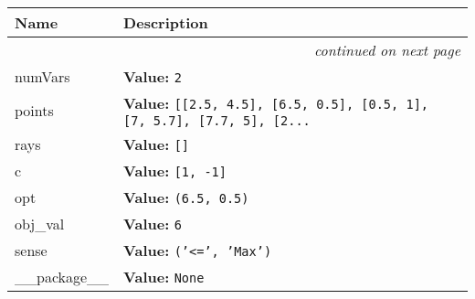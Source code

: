     \vspace{-1cm}
\hspace{\varindent}\begin{longtable}{|p{\varnamewidth}|p{\vardescrwidth}|l}
\cline{1-2}
\cline{1-2} \centering \textbf{Name} & \centering \textbf{Description}& \\
\cline{1-2}
\endhead\cline{1-2}\multicolumn{3}{r}{\small\textit{continued on next page}}\\\endfoot\cline{1-2}
\endlastfoot\raggedright n\-u\-m\-V\-a\-r\-s\- & \raggedright \textbf{Value:} 
{\tt 2}&\\
\cline{1-2}
\raggedright p\-o\-i\-n\-t\-s\- & \raggedright \textbf{Value:} 
{\tt \texttt{[}\texttt{[}2.5\texttt{, }4.5\texttt{]}\texttt{, }\texttt{[}6.5\texttt{, }0.5\texttt{]}\texttt{, }\texttt{[}0.5\texttt{, }1\texttt{]}\texttt{, }\texttt{[}7\texttt{, }5.7\texttt{]}\texttt{, }\texttt{[}7.7\texttt{, }5\texttt{]}\texttt{, }\texttt{[}2\texttt{...}}&\\
\cline{1-2}
\raggedright r\-a\-y\-s\- & \raggedright \textbf{Value:} 
{\tt \texttt{[}\texttt{]}}&\\
\cline{1-2}
\raggedright c\- & \raggedright \textbf{Value:} 
{\tt \texttt{[}1\texttt{, }-1\texttt{]}}&\\
\cline{1-2}
\raggedright o\-p\-t\- & \raggedright \textbf{Value:} 
{\tt \texttt{(}6.5\texttt{, }0.5\texttt{)}}&\\
\cline{1-2}
\raggedright o\-b\-j\-\_\-v\-a\-l\- & \raggedright \textbf{Value:} 
{\tt 6}&\\
\cline{1-2}
\raggedright s\-e\-n\-s\-e\- & \raggedright \textbf{Value:} 
{\tt \texttt{(}\texttt{'}\texttt{{\textless}=}\texttt{'}\texttt{, }\texttt{'}\texttt{Max}\texttt{'}\texttt{)}}&\\
\cline{1-2}
\raggedright \_\-\_\-p\-a\-c\-k\-a\-g\-e\-\_\-\_\- & \raggedright \textbf{Value:} 
{\tt None}&\\
\cline{1-2}
\end{longtable}

